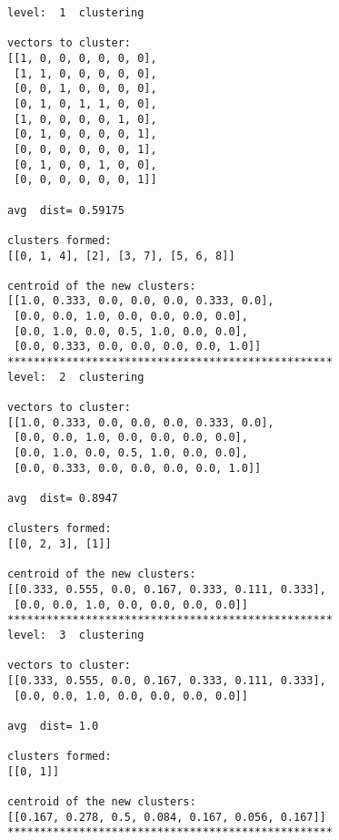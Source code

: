 \documentclass[11pt]{article}
\begin{document}
    \begin{Verbatim}[commandchars=\\\{\}]
level:  1  clustering

vectors to cluster:
[[1, 0, 0, 0, 0, 0, 0],
 [1, 1, 0, 0, 0, 0, 0],
 [0, 0, 1, 0, 0, 0, 0],
 [0, 1, 0, 1, 1, 0, 0],
 [1, 0, 0, 0, 0, 1, 0],
 [0, 1, 0, 0, 0, 0, 1],
 [0, 0, 0, 0, 0, 0, 1],
 [0, 1, 0, 0, 1, 0, 0],
 [0, 0, 0, 0, 0, 0, 1]]

avg  dist= 0.59175

clusters formed:
[[0, 1, 4], [2], [3, 7], [5, 6, 8]]

centroid of the new clusters:
[[1.0, 0.333, 0.0, 0.0, 0.0, 0.333, 0.0],
 [0.0, 0.0, 1.0, 0.0, 0.0, 0.0, 0.0],
 [0.0, 1.0, 0.0, 0.5, 1.0, 0.0, 0.0],
 [0.0, 0.333, 0.0, 0.0, 0.0, 0.0, 1.0]]
**************************************************
level:  2  clustering

vectors to cluster:
[[1.0, 0.333, 0.0, 0.0, 0.0, 0.333, 0.0],
 [0.0, 0.0, 1.0, 0.0, 0.0, 0.0, 0.0],
 [0.0, 1.0, 0.0, 0.5, 1.0, 0.0, 0.0],
 [0.0, 0.333, 0.0, 0.0, 0.0, 0.0, 1.0]]

avg  dist= 0.8947

clusters formed:
[[0, 2, 3], [1]]

centroid of the new clusters:
[[0.333, 0.555, 0.0, 0.167, 0.333, 0.111, 0.333],
 [0.0, 0.0, 1.0, 0.0, 0.0, 0.0, 0.0]]
**************************************************
level:  3  clustering

vectors to cluster:
[[0.333, 0.555, 0.0, 0.167, 0.333, 0.111, 0.333],
 [0.0, 0.0, 1.0, 0.0, 0.0, 0.0, 0.0]]

avg  dist= 1.0

clusters formed:
[[0, 1]]

centroid of the new clusters:
[[0.167, 0.278, 0.5, 0.084, 0.167, 0.056, 0.167]]
**************************************************

    \end{Verbatim}


    
    
    
    
\end{document}
